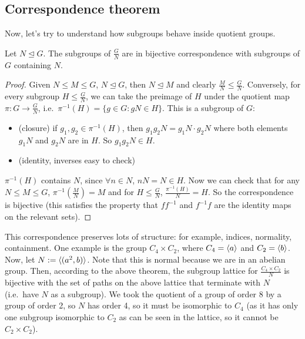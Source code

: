 \subsection{Correspondence theorem}
Now, let's try to understand how subgroups behave inside quotient groups.
\begin{theorem}
	Let \(N \trianglelefteq G\).
	The subgroups of \(\frac{G}{N}\) are in bijective correspondence with subgroups of \(G\) containing \(N\).
\end{theorem}
\begin{proof}
	Given \(N \leq M \leq G\), \(N \trianglelefteq G\), then \(N \trianglelefteq M\) and clearly \(\frac{M}{N} \leq \frac{G}{N}\).
	Conversely, for every subgroup \(H \leq \frac{G}{N}\), we can take the preimage of \(H\) under the quotient map \(\pi : G \to \frac{G}{N}\), i.e.\ \(\pi^{-1}(H) = \{ g \in G : gN \in H \}\).
	This is a subgroup of \(G\):
	\begin{itemize}
		\item (closure) if \(g_1, g_2 \in \pi^{-1}(H)\), then \(g_1g_2N = g_1N\cdot g_2N\) where both elements \(g_1N\) and \(g_2N\) are in \(H\).
		      So \(g_1g_2N \in H\).
		\item (identity, inverses easy to check)
	\end{itemize}
	\(\pi^{-1}(H)\) contains \(N\), since \(\forall n \in N\), \(nN = N \in H\).
	Now we can check that for any \(N \leq M \leq G\), \(\pi^{-1}(\frac{M}{N}) = M\) and for \(H \leq \frac{G}{N}\), \(\frac{\pi^{-1}(H)}{N} = H\).
	So the correspondence is bijective (this satisfies the property that \(ff^{-1}\) and \(f^{-1}f\) are the identity maps on the relevant sets).
\end{proof}
This correspondence preserves lots of structure: for example, indices, normality, containment.
One example is the group \(C_4 \times C_2\), where \(C_4 = \langle{} a \rangle\) and \(C_2 = \langle{} b \rangle\).
Now, let \(N := \langle{} (a^2, b) \rangle\).
Note that this is normal because we are in an abelian group.
Then, according to the above theorem, the subgroup lattice for \(\frac{C_4 \times C_2}{N}\) is bijective with the set of paths on the above lattice that terminate with \(N\) (i.e.\ have \(N\) as a subgroup).
We took the quotient of a group of order 8 by a group of order 2, so \(N\) has order 4, so it must be isomorphic to \(C_4\) (as it has only one subgroup isomorphic to \(C_2\) as can be seen in the lattice, so it cannot be \(C_2 \times C_2\)).


